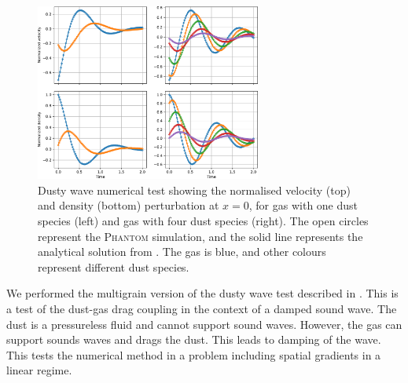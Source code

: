 \documentclass[fleqn,usenatbib]{mnras}
\begin{document}
\begin{figure}
   \begin{center}
      \includegraphics[width=0.66\textwidth]{figs/dustywave_velocity_density.pdf}
      \caption{Dusty wave numerical test showing the normalised velocity (top)
         and density (bottom) perturbation at \(x = 0\), for gas with one dust
         species (left) and gas with four dust species (right). The open circles
         represent the \textsc{Phantom} simulation, and the solid line
         represents the analytical solution from
         \citet{Benitez-Llambay2019ApJS..241...25B}. The gas is blue, and other
         colours represent different dust species.%
         \label{fig:dustywave}}
   \end{center}
\end{figure}

We performed the multigrain version of the dusty wave test described in
\citet{Laibe2011MNRAS.418.1491L}. This is a test of the dust-gas drag coupling
in the context of a damped sound wave. The dust is a pressureless fluid and
cannot support sound waves. However, the gas can support sounds waves and drags
the dust. This leads to damping of the wave. This tests the numerical
method in a problem including spatial gradients in a linear regime.
\end{document}
